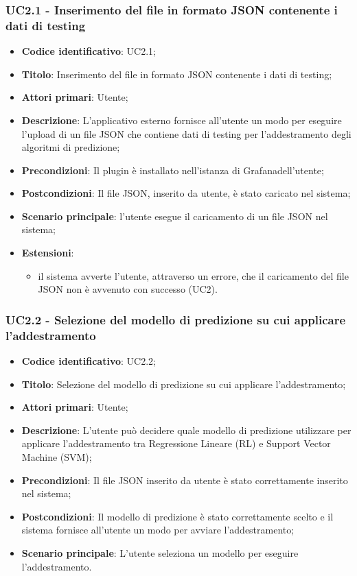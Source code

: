 \subsubsection{UC2.1 - Inserimento del file in formato JSON contenente i dati di testing}
\begin{itemize}
    \item \textbf{Codice identificativo}: UC2.1;
    \item \textbf{Titolo}: Inserimento del file in formato JSON contenente i dati di testing;
    \item \textbf{Attori primari}: Utente;
    \item \textbf{Descrizione}: L'applicativo esterno fornisce all'utente un modo per eseguire l'upload di un file JSON che contiene dati di testing per l'addestramento degli algoritmi di predizione;
    \item \textbf{Precondizioni}: Il plugin è installato nell'istanza di Grafana\glosp dell'utente;
    \item \textbf{Postcondizioni}: Il file JSON, inserito da utente, è stato caricato nel sistema;
    \item \textbf{Scenario principale}: l'utente esegue il caricamento di un file JSON nel sistema;
    \item \textbf{Estensioni}:
        \begin{itemize}
            \item il sistema avverte l'utente, attraverso un errore, che il caricamento del file JSON non è avvenuto con successo (UC2).
        \end{itemize}

\end{itemize}

\subsubsection{UC2.2 - Selezione del modello di predizione su cui applicare l'addestramento}
\begin{itemize}
    \item \textbf{Codice identificativo}: UC2.2;
    \item \textbf{Titolo}: Selezione del modello di predizione su cui applicare l'addestramento;
    \item \textbf{Attori primari}: Utente;
    \item \textbf{Descrizione}: L'utente può decidere quale modello di predizione utilizzare per applicare l'addestramento tra Regressione Lineare (RL\glo) e Support Vector Machine (SVM\glo);
    \item \textbf{Precondizioni}: Il file JSON inserito da utente è stato correttamente inserito nel sistema;
    \item \textbf{Postcondizioni}: Il modello di predizione è stato correttamente scelto e il sistema fornisce all'utente un modo per avviare l'addestramento;
    \item \textbf{Scenario principale}: L'utente seleziona un modello per eseguire l'addestramento.
    
\end{itemize}

